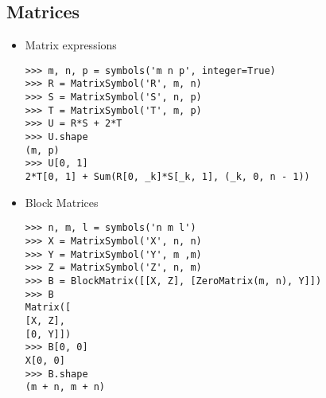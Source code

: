 \subsection{Matrices}

\begin{itemize}
\item Matrix expressions
\begin{verbatim}
>>> m, n, p = symbols('m n p', integer=True)
>>> R = MatrixSymbol('R', m, n)
>>> S = MatrixSymbol('S', n, p)
>>> T = MatrixSymbol('T', m, p)
>>> U = R*S + 2*T
>>> U.shape
(m, p)
>>> U[0, 1]
2*T[0, 1] + Sum(R[0, _k]*S[_k, 1], (_k, 0, n - 1))
\end{verbatim}

\item Block Matrices
\begin{verbatim}
>>> n, m, l = symbols('n m l')
>>> X = MatrixSymbol('X', n, n)
>>> Y = MatrixSymbol('Y', m ,m)
>>> Z = MatrixSymbol('Z', n, m)
>>> B = BlockMatrix([[X, Z], [ZeroMatrix(m, n), Y]])
>>> B
Matrix([
[X, Z],
[0, Y]])
>>> B[0, 0]
X[0, 0]
>>> B.shape
(m + n, m + n)
\end{verbatim}
\end{itemize}
